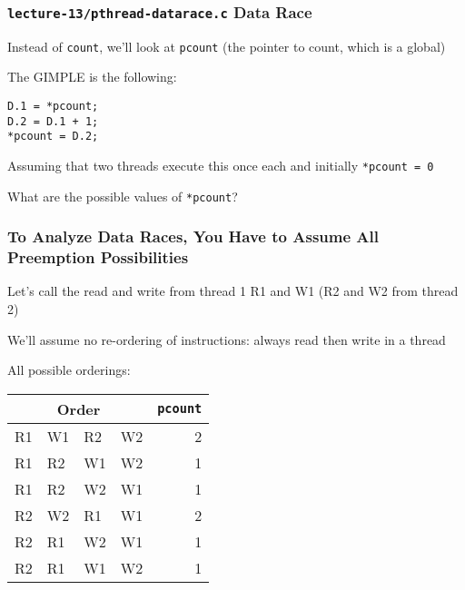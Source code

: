   \begin{frame}[fragile]
    \frametitle{\texttt{lecture-13/pthread-datarace.c} Data Race}

    Instead of \texttt{count}, we'll look at \texttt{pcount} (the pointer to
    count, which is a global)

    \vspace{2em}

    The GIMPLE is the following:
    \begin{lstlisting}
D.1 = *pcount;
D.2 = D.1 + 1;
*pcount = D.2;
    \end{lstlisting}

    \vspace{2em}
    
    Assuming that two threads execute this once each
    and initially \texttt{*pcount = 0}

    \hspace{2em} What are the possible values of \texttt{*pcount}?
  \end{frame}

  \begin{frame}
    \frametitle{To Analyze Data Races, You Have to Assume All Preemption Possibilities}

    Let's call the read and write from thread 1 R1 and W1 (R2 and W2 from thread 2)

    \vspace{2em}

    We'll assume no re-ordering of instructions: always read then write in
    a thread

    \vspace{2em}

    All possible orderings:
    \begin{center}
      \begin{tabular}{llll|r}
        \multicolumn{4}{c|}{Order} & {\tt *pcount}\\
        \hline
        R1 & W1 & R2 & W2 & 2 \\
        R1 & R2 & W1 & W2 & 1 \\
        R1 & R2 & W2 & W1 & 1 \\
        R2 & W2 & R1 & W1 & 2 \\
        R2 & R1 & W2 & W1 & 1 \\
        R2 & R1 & W1 & W2 & 1 \\
      \end{tabular}
    \end{center}
  \end{frame}

